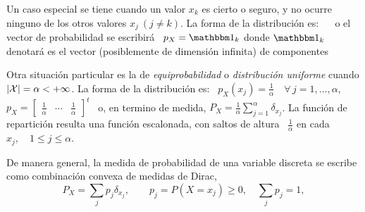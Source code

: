Un caso especial se tiene cuando un  valor $x_k$ es cierto o seguro, y no ocurre
ninguno de los  otros valores $x_j \  (j \ne k)$. La forma  de la distribuci\'on
es: \  \  o el vector de
probabilidad  se escribir\'a  \ $p_X  = \un_k$  donde $\un_k$  denotar\'a  es el
vector  (posiblemente de dimensi\'on  infinita) de  componentes 


Otra   situaci\'on  particular   es  la   de  {\it   equiprobabilidad}   o  {\it
  distribuci\'on uniforme}  cuando $|\mathcal{X}|  = \alpha <  +\infty$.  La forma  de la
distribuci\'on es: \ $p_X(x_j) = \frac1\alpha \quad  \forall \, j = 1 , \ldots ,
\alpha$,    \ie   $p_X    =    \begin{bmatrix}   \frac1\alpha    &   \cdots    &
  \frac1\alpha \end{bmatrix}^t$ \  o, en termino de medida,  $P_X = \frac1\alpha
\sum_{j=1}^\alpha  \delta_{x_j}$.   La funci\'on  de  repartici\'on resulta  una
funci\'on escalonada, con saltos de  altura \ $\frac1\alpha$ en cada $x_j, \quad
1 \le j \le \alpha$.

De manera general, la medida de probabilidad de una variable discreta se escribe
como combinaci\'on convexa de medidas de Dirac,
%
\[
P_X = \sum_j p_j \delta_{x_j}, \qquad p_j = P(X=x_j) \ge 0, \quad \sum_j p_j = 1, 
\]
%

\


